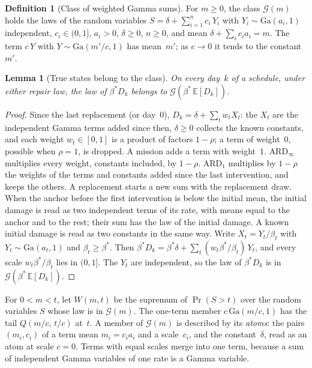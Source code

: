 \documentclass[11pt,a4paper]{article}
\theoremstyle{plain}
\newtheorem{lemma}[theorem]{Lemma}
\theoremstyle{definition}
\newtheorem{definition}[theorem]{Definition}
\theoremstyle{remark}
\begin{document}
\begin{definition}[Class of weighted Gamma sums]\label{def:gamma_class}
For $m \ge 0$, the class $\mathcal{G}(m)$ holds the laws of the random variables $S = \delta + \sum_{i=1}^{n} c_i\, Y_i$ with $Y_i \sim \mathrm{Ga}(a_i, 1)$ independent, $c_i \in (0,1]$, $a_i > 0$, $\delta \ge 0$, $n \ge 0$, and mean $\delta + \sum_i c_i a_i = m$.
The term $c\,Y$ with $Y \sim \mathrm{Ga}(m'/c, 1)$ has mean~$m'$; as $c \to 0$ it tends to the constant~$m'$.
\end{definition}

\begin{lemma}[True states belong to the class]\label{lem:gamma_class}
On every day~$k$ of a schedule, under either repair law, the law of $\beta^* D_k$ belongs to $\mathcal{G}(\beta^*\,\mathbb{E}[D_k])$.
\end{lemma}
\begin{proof}
Since the last replacement (or day~$0$), $D_k = \delta + \sum_t w_t X_t$: the $X_t$ are the independent Gamma terms added since then, $\delta \ge 0$ collects the known constants, and each weight $w_t \in [0,1]$ is a product of factors $1-\rho$; a term of weight~$0$, possible when $\rho = 1$, is dropped.
A mission adds a term with weight~$1$.
$\text{ARD}_\infty$ multiplies every weight, constants included, by $1-\rho$.
$\text{ARD}_1$ multiplies by $1-\rho$ the weights of the terms and constants added since the last intervention, and keeps the others.
A replacement starts a new sum with the replacement draw.
When the anchor before the first intervention is below the initial mean, the initial damage is read as two independent terms of its rate, with means equal to the anchor and to the rest; their sum has the law of the initial damage.
A known initial damage is read as two constants in the same way.
Write $X_t = Y_t/\beta_t$ with $Y_t \sim \mathrm{Ga}(a_t, 1)$ and $\beta_t \ge \beta^*$.
Then $\beta^* D_k = \beta^*\delta + \sum_t (w_t\beta^*/\beta_t)\, Y_t$, and every scale $w_t\beta^*/\beta_t$ lies in $(0,1]$.
The $Y_t$ are independent, so the law of $\beta^* D_k$ is in $\mathcal{G}(\beta^*\,\mathbb{E}[D_k])$.
\end{proof}

For $0 < m < t$, let $W(m, t)$ be the supremum of $\Pr(S > t)$ over the random variables $S$ whose law is in $\mathcal{G}(m)$.
The one-term member $c\,\mathrm{Ga}(m/c, 1)$ has the tail $Q(m/c,\, t/c)$ at~$t$.
A member of $\mathcal{G}(m)$ is described by its \emph{atoms}: the pairs $(m_i, c_i)$ of a term mean $m_i = c_i a_i$ and a scale~$c_i$, and the constant~$\delta$, read as an atom at scale $c = 0$.
Terms with equal scales merge into one term, because a sum of independent Gamma variables of one rate is a Gamma variable.
\end{document}
